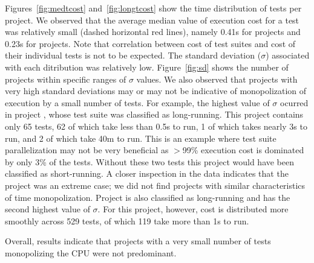 \sloppy Figures~\ref{fig:medtcost} and~\ref{fig:longtcost} show the
time distribution of tests per project.  We observed that the average
median value of execution cost for a test was relatively small (dashed
horizontal red lines), namely 0.41s for \medg{} projects and 0.23s for
\longg{} projects.  Note that correlation between cost of test suites
and cost of their individual tests is not to be expected.  The
standard deviation ($\sigma$) associated with each ditribution was
relatively low.  Figure~\ref{fig:sd} shows the number of projects
within specific ranges of $\sigma$ values.  We also observed that
projects with very high standard deviations may or may not be
indicative of monopolization of execution by a small number of tests.
For example, the highest value of $\sigma$ ocurred in project
, whose test suite was classified as
long-running.  This project contains only 65 tests, 62 of which take
less than 0.5s to run, 1 of which takes nearly 3s to run, and 2 of
which take 40m to run.  This is an example where test suite
parallelization may not be very beneficial as $>$99\% execution cost
is dominated by only 3\% of the tests.  Without these two tests this
project would have been classified as short-running.  A closer
inspection in the data indicates that the project
 was an extreme case; we did not find projects
with similar characteristics of time monopolization.  Project
 is also classified as
long-running and has the second highest value of $\sigma$.  For this
project, however, cost is distributed more smoothly across 529 tests,
of which 119 take more than 1s to run.  

Overall, results indicate that projects with a very small number of
tests monopolizing the CPU were not predominant.

\begin{table}[h!]

\end{table}  






